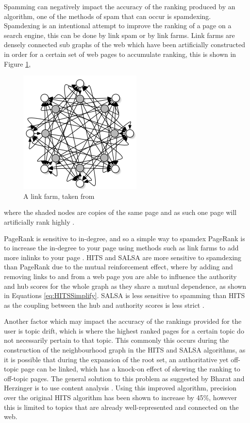 \documentclass[11pt]{report}
\begin{document}
Spamming can negatively impact the accuracy of the ranking produced by an algorithm, one of the methods of spam that can occur is spamdexing. Spamdexing is an intentional attempt to improve the ranking of a page on a search engine, this can be done by link spam or by link farms. Link farms are densely connected sub graphs of the web which have been artificially constructed in order for a certain set of web pages to accumulate ranking, this is shown in Figure \ref{fig:link farm},
\begin{figure}[h]
\centering
\includegraphics[width=0.5\linewidth]{link_farm_baldi.png}
\caption{A link farm, taken from \cite{baldi2003modeling}}
\label{fig:link farm}
\end{figure}
where the shaded nodes are copies of the same page and as such one page will artificially rank highly \cite{baldi2003modeling}. 


PageRank is sensitive to in-degree, and so a simple way to spamdex PageRank is to increase the in-degree to your page using methods such as link farms to add more inlinks to your page \cite{bonato}. HITS and SALSA are more sensitive to spamdexing than PageRank due to the mutual reinforcement effect, where by adding and removing links to and from a web page you are able to influence the authority and hub scores for the whole graph as they share a mutual dependence, as shown in Equations \eqref{eq:HITSSimplify}. SALSA is less sensitive to spamming than HITS as the coupling between the hub and authority scores is less strict \cite{lempel2000stochastic}.

Another factor which may impact the accuracy of the rankings provided for the user is topic drift, which is where the highest ranked pages for a certain topic do not necessarily pertain to that topic. This commonly this occurs during the construction of the neighbourhood graph in the HITS and SALSA algorithms, as it is possible that during the expansion of the root set, an authoritative yet off-topic page can be linked, which has a knock-on effect of skewing the ranking to off-topic pages. The general solution to this problem as suggested by Bharat and Herzinger is to use content analysis \cite{bharat1998improved}. Using this improved algorithm, precision over the original HITS algorithm has been shown to increase by 45\%, however this is limited to topics that are already well-represented and connected on the web.
\end{document}
